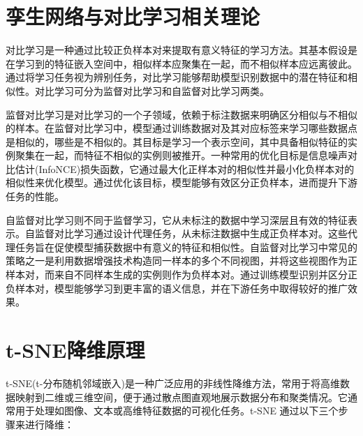\documentclass[master]{thesis-uestc}
\begin{document}
\section{孪生网络与对比学习相关理论}
对比学习是一种通过比较正负样本对来提取有意义特征的学习方法。其基本假设是在学习到的特征嵌入空间中，相似样本应聚集在一起，而不相似样本应远离彼此。通过将学习任务视为辨别任务，对比学习能够帮助模型识别数据中的潜在特征和相似性。对比学习可分为监督对比学习和自监督对比学习两类。

监督对比学习是对比学习的一个子领域，依赖于标注数据来明确区分相似与不相似的样本。在监督对比学习中，模型通过训练数据对及其对应标签来学习哪些数据点是相似的，哪些是不相似的。其目标是学习一个表示空间，其中具备相似特征的实例聚集在一起，而特征不相似的实例则被推开。一种常用的优化目标是信息噪声对比估计(InfoNCE)损失函数，它通过最大化正样本对的相似性并最小化负样本对的相似性来优化模型。通过优化该目标，模型能够有效区分正负样本，进而提升下游任务的性能。

自监督对比学习则不同于监督学习，它从未标注的数据中学习深层且有效的特征表示。自监督对比学习通过设计代理任务，从未标注数据中生成正负样本对。这些代理任务旨在促使模型捕获数据中有意义的特征和相似性。自监督对比学习中常见的策略之一是利用数据增强技术构造同一样本的多个不同视图，并将这些视图作为正样本对，而来自不同样本生成的实例则作为负样本对。通过训练模型识别并区分正负样本对，模型能够学习到更丰富的语义信息，并在下游任务中取得较好的推广效果。

\section{t-SNE降维原理}
t-SNE(t-分布随机邻域嵌入)是一种广泛应用的非线性降维方法，常用于将高维数据映射到二维或三维空间，便于通过散点图直观地展示数据分布和聚类情况。它通常用于处理如图像、文本或高维特征数据的可视化任务。t-SNE 通过以下三个步骤来进行降维：
\end{document}
